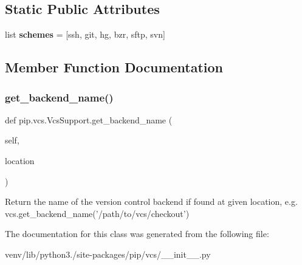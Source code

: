 \subsection*{Static Public Attributes}
\begin{DoxyCompactItemize}
\item 
\mbox{\label{classpip_1_1vcs_1_1_vcs_support_a51435198ebc5f15ff08722132f20cd2a}} 
list {\bfseries schemes} = \mbox{[}\textquotesingle{}ssh\textquotesingle{}, \textquotesingle{}git\textquotesingle{}, \textquotesingle{}hg\textquotesingle{}, \textquotesingle{}bzr\textquotesingle{}, \textquotesingle{}sftp\textquotesingle{}, \textquotesingle{}svn\textquotesingle{}\mbox{]}
\end{DoxyCompactItemize}


\subsection{Member Function Documentation}
\mbox{\label{classpip_1_1vcs_1_1_vcs_support_a6487ce924995420bae7582270c09a02a}} 
\subsubsection{\texorpdfstring{get\+\_\+backend\+\_\+name()}{get\_backend\_name()}}
{\footnotesize\ttfamily def pip.\+vcs.\+Vcs\+Support.\+get\+\_\+backend\+\_\+name (\begin{DoxyParamCaption}\item[{}]{self,  }\item[{}]{location }\end{DoxyParamCaption})}

\begin{DoxyVerb}Return the name of the version control backend if found at given
location, e.g. vcs.get_backend_name('/path/to/vcs/checkout')
\end{DoxyVerb}
 

The documentation for this class was generated from the following file\+:\begin{DoxyCompactItemize}
\item 
venv/lib/python3./site-\/packages/pip/vcs/\+\_\+\+\_\+init\+\_\+\+\_\+.\+py\end{DoxyCompactItemize}
